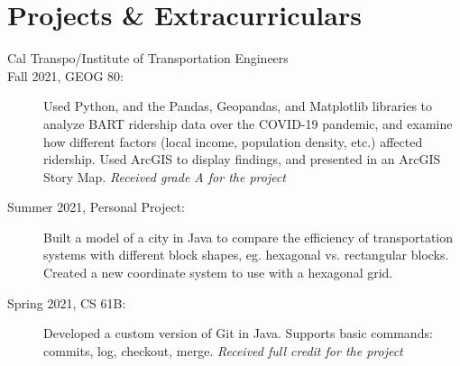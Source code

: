 \section*{Projects \& Extracurriculars}
\secvspace
\begin{description}
    \item [Cal Transpo/Institute of Transportation Engineers]
    \item[Fall 2021, GEOG 80:] Used Python, and the Pandas, Geopandas, and Matplotlib libraries to analyze BART ridership data over the COVID-19 pandemic, and examine how different factors (local income, population density, etc.) affected ridership. Used ArcGIS to display findings, and presented in an ArcGIS Story Map. {\em Received grade A for the project}
    \item[Summer 2021, Personal Project:] Built a model of a city in Java to compare the efficiency of transportation systems with different block shapes, eg. hexagonal vs. rectangular blocks. Created a new coordinate system to use with a hexagonal grid.
    \item[Spring 2021, CS 61B:] Developed a custom version of Git in Java. Supports basic commands: commits, log, checkout, merge. {\em Received full credit for the project}
\end{description}


